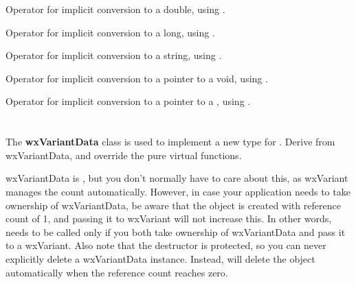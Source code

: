 
Operator for implicit conversion to a double, using .


Operator for implicit conversion to a long, using .

\label{wxvariantwxstring}


Operator for implicit conversion to a string, using .

\label{wxvariantvoid}


Operator for implicit conversion to a pointer to a void, using .

\label{wxvariantdatetime}


Operator for implicit conversion to a pointer to a , using .





\section{}\label{wxvariantdata}

The {\bf wxVariantData} class is used to implement a new type for . 
Derive from wxVariantData, and override the pure virtual functions.

wxVariantData is , but you don't normally have to care about this, 
as wxVariant manages the count automatically. However, in case your application needs to take
ownership of wxVariantData, be aware that the object is created with reference count of 1,
and passing it to wxVariant will not increase this. In other words, 
needs to be called only if you both take ownership of wxVariantData and pass it to a wxVariant.
Also note that the destructor is protected, so you can never explicitly delete a wxVariantData
instance. Instead,  will delete the object automatically
when the reference count reaches zero.

